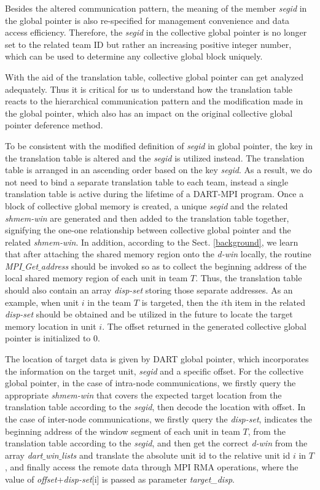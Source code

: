 \documentclass{llncs}
\begin{document}
{Besides the altered communication pattern, the meaning of the member \textit{segid} in the global pointer
is also \mbox{re-specified}
for management convenience and data access efficiency. Therefore, the \textit{segid} 
in the collective global pointer is no longer set to the related team ID but rather
an increasing positive integer number, which 
can be used to determine any collective global block uniquely. 

With the aid of the translation table\cite{dart-mpi}, 
collective global pointer can get analyzed adequately.
Thus it is critical for us to understand how the translation table 
reacts to the hierarchical communication pattern and 
the modification made in the global pointer, which also
has an impact on the original collective global pointer deference method.

To be consistent with the modified definition of \textit{segid} in global pointer,
the key in the translation table is altered and the \textit{segid} is utilized instead.
The translation table is arranged in an ascending order based on the key \textit{segid}. 
As a result,
we do not need to bind a separate translation table to each team, 
instead a single translation table is active during the lifetime of a \mbox{DART-MPI} program. 
Once a block of collective global memory is created, a unique \textit{segid} 
and the related \textit{shmem-win} are generated
and then added to the translation table
together, signifying the \mbox{one-one} relationship between collective global pointer and the related \textit{shmem-win}.
In addition, according to the Sect. \ref{background}, we learn that after 
attaching the shared memory region onto the \mbox{\textit{d-win}} locally, the routine  
{\em MPI$\_$Get$\_$address} should be invoked
so as to collect the beginning address of the local shared memory region
of each unit in team $T$. Thus, the translation 
table should also contain an array \mbox{\textit{disp-set}}
storing those separate addresses. 
As an example, when unit $i$ in the team $T$ is targeted, then the $i$th item in the related
\mbox{\textit{disp-set}} should be obtained and be utilized in the future to locate the target memory location in unit $i$.
The offset returned in the generated 
collective global pointer is initialized to $0$.


The location of target data is given by DART global pointer, which incorporates the information 
on the target unit, 
\textit{segid} and a specific offset. 
For the collective global pointer, in the case of intra-node communications, 
we firstly query the appropriate \mbox{\textit{shmem-win}} that covers the expected target 
location from the translation table according to the \textit{segid}, then decode the location with 
offset. In the case of inter-node communications,
we firstly query the \mbox{\textit{disp-set}}, indicates the beginning address of the window segment of each unit in team $T$,
from the translation table according to the \textit{segid}, and then get the correct \mbox{\textit{d-win}} from the array {\em dart$\_$win$\_$lists}
and translate the absolute unit id to the relative unit id $i$ in $T$,
and finally access the remote data through MPI RMA operations, where
the value of \textit{offset}+\textit{disp-set}[i]
is passed as parameter \textit{target\_disp}.

}
\end{document}
